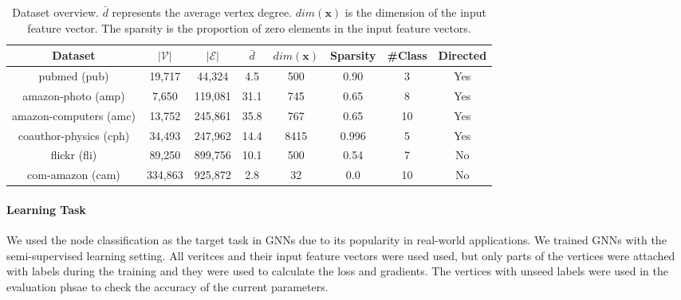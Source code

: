 \begin{table}
    \centering
    \small
    \begin{tabular}{cccccccc}
        \toprule
        Dataset                                                 & $|\mathcal{V}|$ & $|\mathcal{E}|$ & $\bar{d}$ & $dim(\boldsymbol{x})$ & Sparsity & \#Class & Directed \\
        \midrule
        pubmed (pub) \cite{yang2016_revisiting_semisupervised}  & 19,717          & 44,324          & 4.5       & 500                & 0.90     & 3       & Yes      \\
        amazon-photo (amp) \cite{shchur2018_pitfall_of_gnn}     & 7,650           & 119,081         & 31.1      & 745                & 0.65     & 8       & Yes      \\
        amazon-computers (amc) \cite{shchur2018_pitfall_of_gnn} & 13,752          & 245,861         & 35.8      & 767                & 0.65     & 10      & Yes      \\
        coauthor-physics (cph) \cite{shchur2018_pitfall_of_gnn} & 34,493          & 247,962         & 14.4      & 8415               & 0.996    & 5       & Yes      \\
        flickr (fli) \cite{zeng2020_graphsaint}                 & 89,250          & 899,756         & 10.1      & 500                & 0.54     & 7       & No       \\
        com-amazon (cam) \cite{yang2012_defining}                & 334,863         & 925,872         & 2.8       & 32                 & 0.0      & 10      & No       \\
        \bottomrule
    \end{tabular}
    \caption{Dataset overview. $\bar{d}$ represents the average vertex degree. $dim(\boldsymbol{x})$ is the dimension of the input feature vector. The sparsity is the proportion of zero elements in the input feature vectors.}
    \label{tab:dataset_overview}
\end{table}

\paragraph{Learning Task}
We used the node classification as the target task in GNNs due to its popularity in real-world applications.
We trained GNNs with the semi-supervised learning setting.
All veritces and their input feature vectors were used used, but only parts of the vertices were attached with labels during the training and they were used to calculate the loss and gradients.
The vertices with unseed labels were used in the evaluation phsae to check the accuracy of the current parameters.


